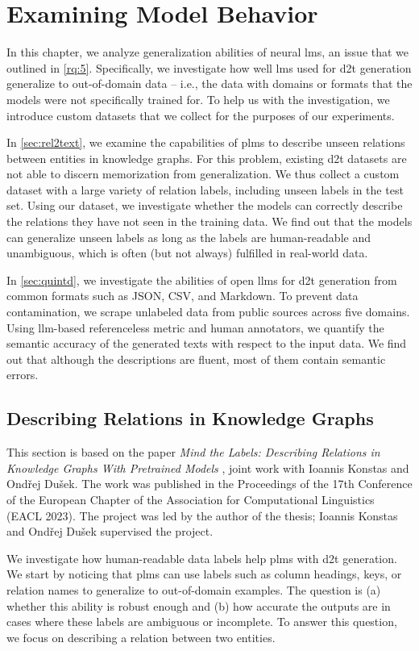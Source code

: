 
\chapter{Examining Model Behavior}
\label{chap:investigating}

In this chapter, we analyze generalization abilities of neural \acp{lm}, an issue that we outlined in \ref{rq:5}. Specifically, we investigate how well \acp{lm} used for \ac{d2t} generation generalize to out-of-domain data -- i.e., the data with domains or formats that the models were not specifically trained for. To help us with the investigation, we introduce custom datasets that we collect for the purposes of our experiments.

In \autoref{sec:rel2text}, we examine the capabilities of \acp{plm} to describe unseen relations between entities in knowledge graphs. For this problem, existing \ac{d2t} datasets are not able to discern memorization from generalization. We thus collect a custom dataset with a large variety of relation labels, including unseen labels in the test set. Using our dataset, we investigate whether the models can correctly describe the relations they have not seen in the training data. We find out that the models can generalize unseen labels as long as the labels are human-readable and unambiguous, which is often (but not always) fulfilled in real-world data.

In \autoref{sec:quintd}, we investigate the abilities of open \acp{llm} for \ac{d2t} generation from common formats such as JSON, CSV, and Markdown. To prevent data contamination, we scrape unlabeled data from public sources across five domains. Using \ac{llm}-based referenceless metric and human annotators, we quantify the semantic accuracy of the generated texts with respect to the input data. We find out that although the descriptions are fluent, most of them contain semantic errors.

\section{Describing Relations in Knowledge Graphs}
\label{sec:rel2text}
\begin{refbox}
    This section is based on the paper \emph{Mind the Labels: Describing Relations in Knowledge Graphs With Pretrained Models} \cite{kasnerMindLabelsDescribing2022}, joint work with Ioannis Konstas and Ondřej Dušek. The work was published in the Proceedings of the 17th Conference of the European Chapter of the Association for Computational Linguistics (EACL 2023). The project was led by the author of the thesis; Ioannis Konstas and Ondřej Dušek supervised the project.
\end{refbox}
We investigate how human-readable data labels help \acp{plm} with \ac{d2t} generation. We start by noticing that \acp{plm} can use labels such as column headings, keys, or relation names to generalize to out-of-domain examples. The question is (a) whether this ability is robust enough and (b) how accurate the outputs are in cases where these labels are ambiguous or incomplete. To answer this question, we focus on describing a relation between two entities.

